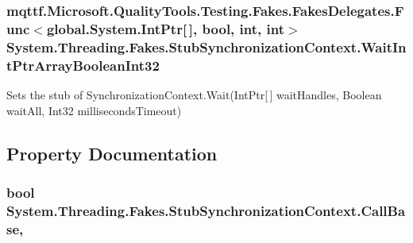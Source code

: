 \hypertarget{class_system_1_1_threading_1_1_fakes_1_1_stub_synchronization_context_a86d9af64879d5f83792610d6aa4622b4}{
\subsubsection[{Wait\-Int\-Ptr\-Array\-Boolean\-Int32}]{\setlength{\rightskip}{0pt plus 5cm}mqttf.\-Microsoft.\-Quality\-Tools.\-Testing.\-Fakes.\-Fakes\-Delegates.\-Func$<$global.\-System.\-Int\-Ptr\mbox{[}$\,$\mbox{]}, bool, int, int$>$ System.\-Threading.\-Fakes.\-Stub\-Synchronization\-Context.\-Wait\-Int\-Ptr\-Array\-Boolean\-Int32}}\label{class_system_1_1_threading_1_1_fakes_1_1_stub_synchronization_context_a86d9af64879d5f83792610d6aa4622b4}


Sets the stub of Synchronization\-Context.\-Wait(\-Int\-Ptr\mbox{[}$\,$\mbox{]} wait\-Handles, Boolean wait\-All, Int32 milliseconds\-Timeout)



\subsection{Property Documentation}
\hypertarget{class_system_1_1_threading_1_1_fakes_1_1_stub_synchronization_context_a6769e1a3903ef762c5bd6473ec2e040c}{
\subsubsection[{Call\-Base}]{\setlength{\rightskip}{0pt plus 5cm}bool System.\-Threading.\-Fakes.\-Stub\-Synchronization\-Context.\-Call\-Base\hspace{0.3cm}{\ttfamily [get]}, {\ttfamily [set]}}}\label{class_system_1_1_threading_1_1_fakes_1_1_stub_synchronization_context_a6769e1a3903ef762c5bd6473ec2e040c}


